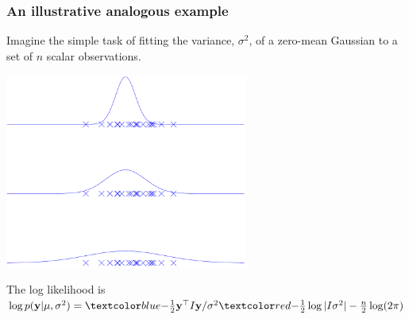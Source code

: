 \begin{frame}
\frametitle{An illustrative analogous example}
Imagine the simple task of fitting the variance, $\sigma^2$, of a zero-mean
Gaussian to a set of $n$ scalar observations.

\centerline{\includegraphics[width=0.6\textwidth]{sgex}}

The log likelihood is $\log p(\bfy|\mu,\sigma^2) =
\Blue{-\tfrac{1}{2}{\bf y}^\top I{\bf y}/\sigma^2} \Red{-\tfrac{1}{2}\log|I\sigma^2|}-
\tfrac{n}{2}\log(2\pi)$ 

\end{frame}

